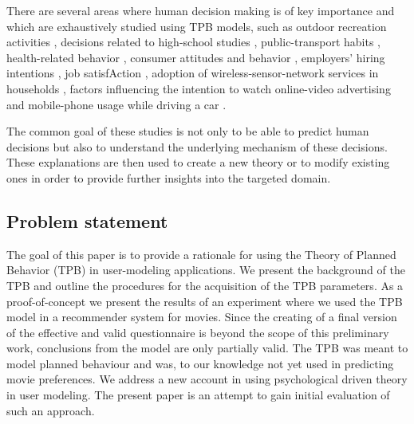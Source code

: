 \documentclass{llncs}
\begin{document}
 
There are several areas where human decision making is of key importance and which are exhaustively studied using TPB models, such as outdoor recreation activities \cite{Daigle2002}, decisions related to high-school studies \cite{Davis2002}, public-transport habits \cite{Bamberg2003}, health-related behavior \cite{Ajzen2007},  consumer attitudes and behavior \cite{Ajzen2008}, employers’ hiring intentions \cite{Fraser2010}, job satisfAction \cite{IcekAjzen2011}, adoption of wireless-sensor-network services in households \cite{Lin2011}, factors influencing the intention to watch online-video advertising \cite{Lee2011} and mobile-phone usage while driving a car \cite{Walsh2008}.%

The common goal of these studies is not only to be able to predict human decisions but also to understand the underlying mechanism of these decisions. These explanations are then used to create a new theory or to modify existing ones in order to provide further insights into the targeted domain.





\subsection{Problem statement}\label{SubSec_}

The goal of this paper is to provide a rationale for using the Theory of Planned Behavior (TPB) in user-modeling applications. We present the background of the TPB and outline the procedures for the acquisition of the TPB parameters. As a proof-of-concept we present the results of an experiment where we used the TPB model in a recommender system for movies. Since the creating of a final version of the effective and valid questionnaire is beyond the scope of this preliminary work,  conclusions from the model are only partially valid. The TPB was meant to model planned behaviour and was, to our knowledge not yet used in predicting movie preferences. We address a new account in using psychological driven theory in user modeling. The present paper is an attempt to gain initial evaluation of such an approach.
\end{document}
